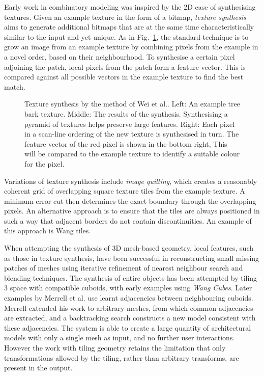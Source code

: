 Early work in combinatory modeling  was inspired by the 2D case of synthesising textures. Given an example texture in the form of a bitmap, \emph{texture synthesis} aims to generate additional bitmaps that are at the same time characteristically similar to the input and yet unique. As in Fig.~\ref{fig:tSynth}, the standard technique is to grow an image from an example texture by combining pixels from the example in a novel order, based on their neighbourhood. To synthesise a certain pixel adjoining the patch, local pixels from the patch form a feature vector. This is compared against all possible vectors in the example texture to find the best match\cite{Efros99,Wei:2000:FTS}. 

\begin{figure}
\centering
\def\svgwidth{1.0\columnwidth}

\caption[Texture Synthesis]{\label{fig:tSynth}Texture synthesis by the method of Wei et al.\cite{Wei:2000:FTS}. Left: An example tree bark texture. Middle: The results of the synthesis. Synthesising a pyramid of textures helps preserve large features. Right: Each pixel in a scan-line ordering of the new texture is synthesised in turn. The feature vector of the red pixel is shown in the bottom right, This will be compared to the example texture to identify a suitable colour for the pixel.}
\end{figure}

Variations of texture synthesis include \emph{image quilting}\cite{Efros:2001:IQF}, which creates a reasonably coherent grid of overlapping square texture tiles from the example texture. A minimum error cut then determines the exact boundary through the overlapping pixels. An alternative approach is to ensure that the tiles are always positioned in such a way that adjacent borders do not contain discontinuities. An example of this approach is Wang tiles\cite{Cohen03}.

When attempting the synthesis of 3D mesh-based geometry, local features, such as those in texture synthesis, have been successful in reconstructing small missing patches of meshes\cite{Sharf04} using iterative refinement of nearest neighbour search and blending techniques. The synthesis of entire objects has been attempted by tiling 3 space with compatible cuboids, with early examples using \emph{Wang Cubes}\cite{Sibley04}. Later examples by Merrell et al.\cite{Merrell07} use learnt adjacencies between neighbouring cuboids. Merrell extended his work to arbitrary meshes\cite{Merrell08}, from which common adjacencies are extracted, and a backtracking search constructs a new model consistent with these adjacencies. The system is able to create a large quantity of architectural models with only a single mesh as input, and no further user interactions. However the work with tiling geometry retains the limitation that only transformations allowed by the tiling, rather than arbitrary transforms, are present in the output.

